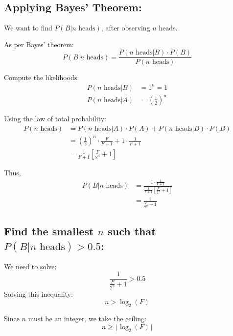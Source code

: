 \documentclass{article}
\begin{document}
\subsection*{Applying Bayes' Theorem:}
We want to find $P(B|n\text{ heads})$, after observing $n$ heads.

As per Bayes' theorem:
\begin{equation}
P(B|n\text{ heads}) = \frac{P(n\text{ heads}|B) \cdot P(B)}{P(n\text{ heads})}
\end{equation}

Compute the likelihoods:
\begin{align}
P(n\text{ heads}|B) &= 1^n = 1 \\
P(n\text{ heads}|A) &= \left(\frac{1}{2}\right)^n
\end{align}

Using the law of total probability:
\begin{align}
P(n\text{ heads}) &= P(n\text{ heads}|A) \cdot P(A) + P(n\text{ heads}|B) \cdot P(B) \\
&= \left(\frac{1}{2}\right)^n \cdot \frac{F}{F+1} + 1 \cdot \frac{1}{F+1} \\
&= \frac{1}{F+1}\left[\frac{F}{2^n} + 1\right]
\end{align}

Thus, 
\begin{align}
P(B|n\text{ heads}) &= \frac{1 \cdot \frac{1}{F+1}}{\frac{1}{F+1}\left[\frac{F}{2^n} + 1\right]} \\
&= \frac{1}{\frac{F}{2^n} + 1}
\end{align}

\subsection*{Find the smallest $n$ such that $P(B|n\text{ heads}) > 0.5$:}
We need to solve:
\begin{equation}
\frac{1}{\frac{F}{2^n} + 1} > 0.5
\end{equation}
Solving this inequality:
\begin{equation}
    n > \log_2(F)
\end{equation}

Since $n$ must be an integer, we take the ceiling:
\begin{equation}
n \geq \lceil \log_2(F) \rceil
\end{equation}
\end{document}
